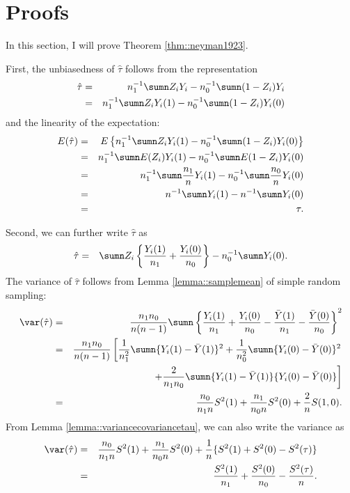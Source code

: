  

\section{Proofs}\label{sec::prove-neyman-1923}

In this section, I will prove  Theorem \ref{thm::neyman1923}.


First, the unbiasedness of $\hat{\tau}$ follows from the representation
\begin{eqnarray*}
\hat{\tau} &=& n_1^{-1} \sumn Z_i Y_i - n_0^{-1} \sumn (1-Z_i) Y_i \\
&=& n_1^{-1} \sumn Z_i Y_i(1) - n_0^{-1} \sumn (1-Z_i) Y_i(0) 
\end{eqnarray*}
and the linearity of the expectation:
\begin{eqnarray*}
E( \hat{\tau}  ) &=& E\left\{    n_1^{-1} \sumn Z_i Y_i(1) - n_0^{-1} \sumn (1-Z_i) Y_i(0)   \right\} \\
&=& n_1^{-1} \sumn E(Z_i) Y_i(1) - n_0^{-1} \sumn E(1-Z_i) Y_i(0) \\
&=& n_1^{-1} \sumn \frac{n_1}{n} Y_i(1) - n_0^{-1} \sumn \frac{n_0}{n} Y_i(0) \\
&=&  n^{-1} \sumn Y_i(1) - n^{-1} \sumn Y_i(0) \\
&=& \tau .
\end{eqnarray*}


Second, we can further write $\hat{\tau}$ as
\begin{eqnarray*}
\hat{\tau} &=&  \sumn Z_i  \left\{    \frac{  Y_i(1) }{ n_1 } + \frac{  Y_i(0) }{ n_0 }   \right\}
- n_0^{-1} \sumn Y_i(0).
\end{eqnarray*}
The variance of $\hat{\tau}$ follows from Lemma \ref{lemma::samplemean} of simple random sampling:
\begin{eqnarray*}
\var(\hat{\tau}) &=&  \frac{  n_1 n_0  }{  n(n-1)  }  \sumn  
\left\{    \frac{  Y_i(1) }{ n_1 } + \frac{  Y_i(0) }{ n_0 }  -  \frac{  \bar{Y}(1) }{ n_1 } - \frac{  \bar{Y}(0) }{ n_0 }    \right\}^2 \\
&=&  \frac{  n_1 n_0  }{  n(n-1)  }  \left[
\frac{1}{n_1^{2}}   \sumn  \{  Y_i(1) -  \bar{Y}(1)\}^2 + \frac{1}{n_0^{2}}  \sumn  \{  Y_i(0) -  \bar{Y}(0)\}^2 \right. \\
&& \left. \qquad \qquad 
+ \frac{2}{n_1 n_0}  \sumn  \{  Y_i(1) -  \bar{Y}(1)\}  \{  Y_i(0) -  \bar{Y}(0)\} 
\right]\\
&=& \frac{n_0}{n_1n} S^2(1) + \frac{n_1}{n_0n}S^2(0) + \frac{2}{n} S(1,0). 
\end{eqnarray*}
From Lemma \ref{lemma::variancecovariancetau}, we can also write the variance as
\begin{eqnarray*}
\var(\hat{\tau})
&=& \frac{n_0}{n_1n} S^2(1) + \frac{n_1}{n_0n}S^2(0) + \frac{1}{n} \{ S^2(1)+S^2(0) - S^2(\tau) \}\\
&=&  \frac{S^2(1)}{n_1} + \frac{S^2(0)}{n_0} - \frac{S^2(\tau)}{n}.
\end{eqnarray*}


